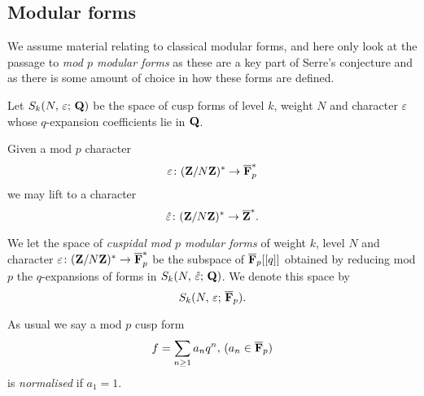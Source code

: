 \documentclass[a4paper,12pt]{article}
\begin{document}
\subsection{Modular forms}
We assume material relating to classical modular forms, and here only look at the passage to \emph{mod $p$ modular forms} as these are a key part of Serre's conjecture and as there is some amount of choice in how these forms are defined.

\begin{defn}
Let $S_k(N,\,\varepsilon;\,\mathbf{Q})$ be the space of cusp forms of level $k$, weight $N$ and character $\varepsilon$ whose $q$-expansion coefficients lie in $\mathbf{Q}$.

Given a mod $p$ character
\[
\varepsilon\colon (\mathbf{Z}/N\mathbf{Z})^* \to \overline{\mathbf{F}}_p^*
\]
we may lift to a character
\[
\hat{\varepsilon}\colon (\ZZ/N\ZZ)^* \to \Zb^*. %
\]

We let the space of \emph{cuspidal mod $p$ modular forms} of weight $k$, level $N$ and character $\varepsilon\colon (\mathbf{Z}/N\mathbf{Z})^* \to \overline{\mathbf{F}}_p^*$ be the subspace of $\overline{\mathbf{F}}_p[[q]]$ obtained by reducing mod $p$ the $q$-expansions of forms in $S_k(N,\,\hat{\varepsilon};\,\mathbf{Q})$.
We denote this space by
\[
S_k(N,\,\varepsilon;\,\overline{\mathbf{F}}_p).
\]
\end{defn}

\begin{defn}
As usual we say a mod $p$ cusp form
\[
f = \sum_{n\ge 1} a_n q^n,\,(a_n\in\overline{\mathbf{F}}_p)
\]
is \emph{normalised} if $a_1 = 1$.
\end{defn}

\iffalse
\begin{comment}
\begin{defn}
Take $R$ to be any subring of $\CC$, we let
\[
S_k(N,\, \varepsilon;\, R)
\]
be the space of cusp forms of weight $k$ for $\Gamma_1(N)$ with character $\varepsilon$ and $q$-expansion coefficients in the ring $R$.
\end{defn}

\begin{ex}
\end{ex}

Notice that if ??

\begin{defn}
Now letting $R$ be any $\ZZ[\varepsilon]$-algebra we can set
\[
S_k(N,\, \varepsilon;\, R) = S_k(N,\, \varepsilon;\, \ZZ[\varepsilon]) \otimes_{\ZZ[\varepsilon]} R
\]
and this is consistent with the above definition.

The space of \emph{cuspidal mod $p$ modular forms} with character $\varepsilon$ is then
\[
S_k(N,\, \varepsilon;\, \Fb_p).
\]
\end{defn}
\end{comment}
\fi
\end{document}
